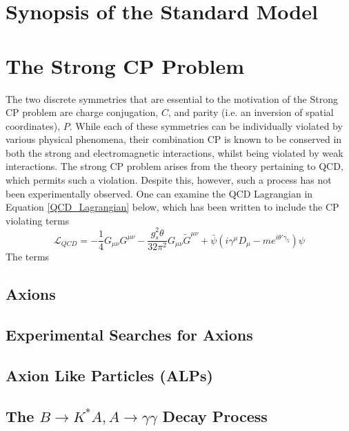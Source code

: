 \section{Synopsis of the Standard Model}
\section{The Strong CP Problem}The two discrete symmetries that are essential to the motivation of the Strong CP problem are charge conjugation, $C$, and parity (i.e. an inversion of spatial coordinates), $P$. While each
of these symmetries can be individually violated by various physical phenomena, their combination CP is known to be conserved in both the strong and electromagnetic interactions, whilst being violated by weak interactions. The strong CP problem arises from the theory pertaining to QCD, which
permits such a violation. Despite this, however, such a process has not been experimentally observed. One can examine the QCD Lagrangian in Equation \ref{QCD_Lagrangian} below, which has been written to include the CP violating terms
\begin{equation}\label{QCD_Lagrangian}
    \mathcal{L}_{QCD} = -\frac{1}{4}G_{\mu\nu}G^{\mu\nu}-\frac{g_{s}^{2}\theta}{32\pi^{2}}G_{\mu\nu}\tilde{G}^{\mu\nu}+\bar{\psi}(i\gamma^{\mu}D_{\mu}-me^{i\theta'\gamma_{5}})\psi
\end{equation}
The terms


\subsection{Axions}
\subsection{Experimental Searches for Axions}
\subsection{Axion Like Particles (ALPs)}
\subsection{The $B\rightarrow K^{*}A, A\rightarrow\gamma\gamma$ Decay Process}